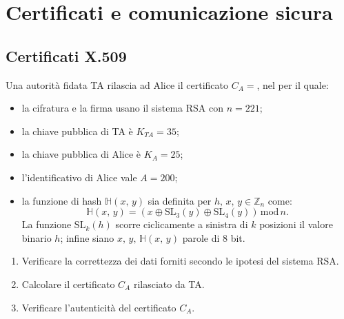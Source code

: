 
\chapter{Certificati e comunicazione sicura}

    \bigskip
    \section{Certificati X.509}
        Una autorità fidata TA rilascia ad Alice il certificato $C_A =$, 
        nel per il quale:
        \begin{itemize}
            \item la cifratura e la firma usano il sistema RSA con $n=221$;
            \item la chiave pubblica di TA è $K_{TA}=35$;
            \item la chiave pubblica di Alice è $K_A=25$;
            \item l'identificativo di Alice vale $A=200$;
            \item la funzione di hash $\mathbb{H}(x,\,y)$ sia definita per $h,\,x,\,y \in \mathbb{Z}_{n}$ come: \[
                    \mathbb{H}(x,\,y) = (x \oplus \text{SL}_3 (y) \oplus \text{SL}_4 (y)) \,\mathrm{mod}\,n
                .\] La funzione $\text{SL}_{k} (h)$ scorre ciclicamente a sinistra di $k$ posizioni il valore 
                binario $h$; infine siano $x,\,y,\,\mathbb{H}(x,\,y)$ parole di 8 bit.
        \end{itemize}
        \begin{enumerate}
            \item Verificare la correttezza dei dati forniti secondo le ipotesi del sistema RSA.
            \item Calcolare il certificato $C_{A}$ rilasciato da TA.
            \item Verificare l'autenticità del certificato $C_{A}$.
        \end{enumerate}

    \bigskip
